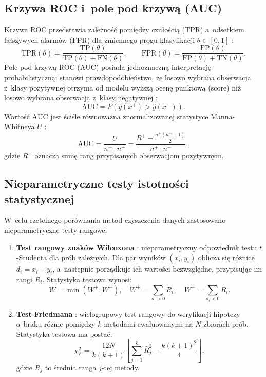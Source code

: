 \subsection{Krzywa ROC i~pole pod krzywą (AUC)}
Krzywa ROC przedstawia zależność pomiędzy czułością ($\mathrm{TPR}$) a~odsetkiem fałszywych alarmów ($\mathrm{FPR}$) dla zmiennego progu klasyfikacji $\theta \in [0, 1]$ \cite{Fawcett2006}:
\begin{equation}
\mathrm{TPR}(\theta) = \frac{\mathrm{TP}(\theta)}{\mathrm{TP}(\theta) + \mathrm{FN}(\theta)}, \qquad \mathrm{FPR}(\theta) = \frac{\mathrm{FP}(\theta)}{\mathrm{FP}(\theta) + \mathrm{TN}(\theta)}.
\end{equation}
Pole pod krzywą ROC ($\mathrm{AUC}$) posiada jednoznaczną interpretację probabilistyczną: stanowi prawdopodobieństwo, że losowo wybrana obserwacja z~klasy pozytywnej otrzyma od modelu wyższą ocenę punktową (score) niż losowo wybrana obserwacja z~klasy negatywnej \cite{Fawcett2006,HanleyMcNeil1982}:
\begin{equation}
\mathrm{AUC} = P(\hat{y}(x^+) > \hat{y}(x^-)).
\end{equation}
Wartość $\mathrm{AUC}$ jest ściśle równoważna znormalizowanej statystyce Manna-Whitneya $U$ \cite{HanleyMcNeil1982}:
\begin{equation}
\mathrm{AUC} = \frac{U}{n^+ \cdot n^-} = \frac{R^+ - \frac{n^+(n^+ + 1)}{2}}{n^+ \cdot n^-},
\end{equation}
gdzie $R^+$ oznacza sumę rang przypisanych obserwacjom pozytywnym.

\subsection{Nieparametryczne testy istotności statystycznej}
W~celu rzetelnego porównania metod czyszczenia danych zastosowano nieparametryczne testy rangowe:
\begin{enumerate}
    \item \textbf{Test rangowy znaków Wilcoxona} \cite{Wilcoxon1945}: nieparametryczny odpowiednik testu $t$-Studenta dla prób zależnych. Dla par wyników $(x_i, y_i)$ oblicza się różnice $d_i = x_i - y_i$, a~następnie porządkuje ich wartości bezwzględne, przypisując im rangi $R_i$. Statystyka testowa wynosi:
    \begin{equation}
    W = \min(W^+, W^-), \quad W^+ = \sum_{d_i > 0} R_i, \quad W^- = \sum_{d_i < 0} R_i.
    \end{equation}
    \item \textbf{Test Friedmana} \cite{Friedman1937}: wielogrupowy test rangowy do weryfikacji hipotezy o~braku różnic pomiędzy $k$ metodami ewaluowanymi na $N$ zbiorach prób. Statystyka testowa ma postać:
    \begin{equation}
    \chi_F^2 = \frac{12 N}{k(k + 1)} \left[ \sum_{j=1}^{k} \bar{R}_j^2 - \frac{k(k + 1)^2}{4} \right],
    \end{equation}
    gdzie $\bar{R}_j$ to średnia ranga $j$-tej metody.
\end{enumerate}
